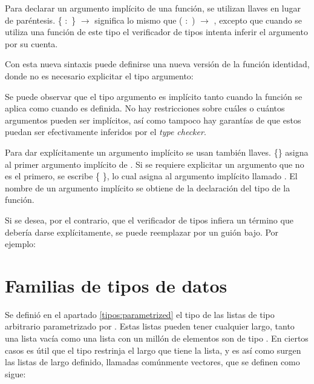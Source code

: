 Para declarar un argumento implícito de una función, se utilizan llaves en lugar de paréntesis. \{ $:$ \} $\rightarrow$  significa lo mismo que ( $:$ ) $\rightarrow$ , excepto que cuando se utiliza una función de este tipo el verificador de tipos intenta inferir el argumento por su cuenta. 

Con esta nueva sintaxis puede definirse una nueva versión de la función identidad, donde no es necesario explicitar el tipo argumento:


Se puede observar que el tipo argumento es implícito tanto cuando la función se aplica como cuando es definida. No hay restricciones sobre cuáles o cuántos argumentos pueden ser implícitos, así como tampoco hay garantías de que estos puedan ser efectivamente inferidos por el \textit{type checker}. 

Para dar explícitamente un argumento implícito se usan también llaves.  \{\} asigna  al primer argumento implícito de . Si se requiere explicitar un argumento que no es el primero, se escribe  \{ \AgdaSymbol{=} \}, lo cual asigna  al argumento implícito llamado . El nombre de un argumento implícito se obtiene de la declaración del tipo de la función. 

Si se desea, por el contrario, que el verificador de tipos infiera un término que debería darse explícitamente, se puede reemplazar por un guión bajo. Por ejemplo:


\section{Familias de tipos de datos}\label{agda:family}

Se definió en el apartado \ref{tipos:parametrized} el tipo de las listas de tipo arbitrario parametrizado por . Estas listas pueden tener cualquier largo, tanto una lista vacía como una lista con un millón de elementos son de tipo  . En ciertos casos es útil que el tipo restrinja el largo que tiene la lista, y es así como surgen las listas de largo definido, llamadas comúnmente vectores, que se definen como sigue:


